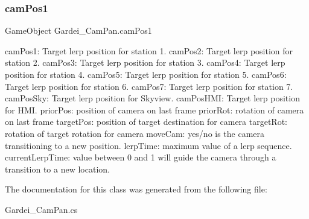\subsubsection{\texorpdfstring{cam\+Pos1}{camPos1}}
{\footnotesize\ttfamily Game\+Object Gardei\+\_\+\+Cam\+Pan.\+cam\+Pos1}



cam\+Pos1\+: Target lerp position for station 1. cam\+Pos2\+: Target lerp position for station 2. cam\+Pos3\+: Target lerp position for station 3. cam\+Pos4\+: Target lerp position for station 4. cam\+Pos5\+: Target lerp position for station 5. cam\+Pos6\+: Target lerp position for station 6. cam\+Pos7\+: Target lerp position for station 7. cam\+Pos\+Sky\+: Target lerp position for Skyview. cam\+Pos\+H\+MI\+: Target lerp position for H\+MI. prior\+Pos\+: position of camera on last frame prior\+Rot\+: rotation of camera on last frame target\+Pos\+: position of target destination for camera target\+Rot\+: rotation of target rotation for camera move\+Cam\+: yes/no is the camera transitioning to a new position. lerp\+Time\+: maximum value of a lerp sequence. current\+Lerp\+Time\+: value between 0 and 1 will guide the camera through a transition to a new location. 



The documentation for this class was generated from the following file\+:\begin{DoxyCompactItemize}
\item 
Gardei\+\_\+\+Cam\+Pan.\+cs\end{DoxyCompactItemize}
